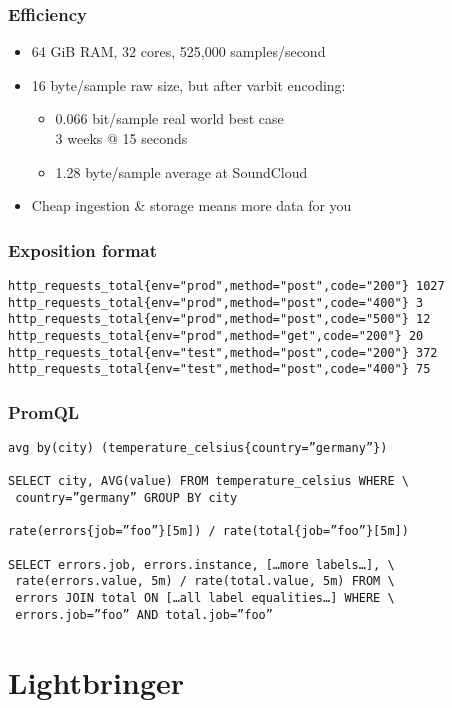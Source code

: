 \documentclass[t]{beamer}
\begin{document}
\begin{frame}
	\frametitle{Efficiency}
	\begin{itemize}
		\item 64 GiB RAM, 32 cores, 525,000 samples/second
		\item 16 byte/sample raw size, but after varbit encoding:
		\begin{itemize}
			\item 0.066 bit/sample real world best case \\
				3 weeks @ 15 seconds
			\item 1.28 byte/sample average at SoundCloud
		\end{itemize}
		\item Cheap ingestion \& storage means more data for you
	\end{itemize}
\end{frame}

\begin{frame}[fragile]
	\frametitle{Exposition format}
	\fontsize{10pt}{12}\selectfont
	\begin{verbatim}
http_requests_total{env="prod",method="post",code="200"} 1027
http_requests_total{env="prod",method="post",code="400"} 3
http_requests_total{env="prod",method="post",code="500"} 12
http_requests_total{env="prod",method="get",code="200"} 20
http_requests_total{env="test",method="post",code="200"} 372
http_requests_total{env="test",method="post",code="400"} 75
	\end{verbatim}
\end{frame}

\begin{frame}[fragile]
	\frametitle{PromQL}
	\begin{verbatim}
avg by(city) (temperature_celsius{country=”germany”})

SELECT city, AVG(value) FROM temperature_celsius WHERE \
 country=”germany” GROUP BY city

rate(errors{job=”foo”}[5m]) / rate(total{job=”foo”}[5m])

SELECT errors.job, errors.instance, […more labels…], \
 rate(errors.value, 5m) / rate(total.value, 5m) FROM \
 errors JOIN total ON […all label equalities…] WHERE \
 errors.job=”foo” AND total.job=”foo”
	\end{verbatim}
\end{frame}


\section{Lightbringer}
\end{document}
